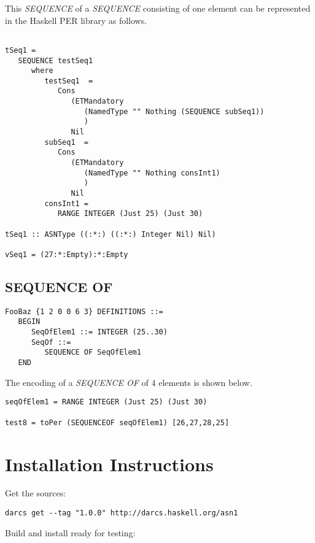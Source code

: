 \documentclass{article}
\begin{document}
This {\em SEQUENCE} of a {\em SEQUENCE} consisting of one element
can be represented in the Haskell PER library as follows.

\begin{lstlisting}[frame=single]

tSeq1 = 
   SEQUENCE testSeq1 
      where
         testSeq1  = 
            Cons 
               (ETMandatory 
                  (NamedType "" Nothing (SEQUENCE subSeq1))
                  )
               Nil
         subSeq1  = 
            Cons 
               (ETMandatory 
                  (NamedType "" Nothing consInt1)
                  ) 
               Nil
         consInt1 = 
            RANGE INTEGER (Just 25) (Just 30)

tSeq1 :: ASNType ((:*:) ((:*:) Integer Nil) Nil)

vSeq1 = (27:*:Empty):*:Empty

\end{lstlisting}

\subsection{SEQUENCE OF}

\begin{lstlisting}[frame=single]
FooBaz {1 2 0 0 6 3} DEFINITIONS ::=
   BEGIN
      SeqOfElem1 ::= INTEGER (25..30)
      SeqOf ::=
         SEQUENCE OF SeqOfElem1
   END
\end{lstlisting}

The encoding of a {\em SEQUENCE OF} of 4 elements is shown
below.

\begin{lstlisting}[frame=single]
seqOfElem1 = RANGE INTEGER (Just 25) (Just 30)

test8 = toPer (SEQUENCEOF seqOfElem1) [26,27,28,25]
\end{lstlisting}

\section{Installation Instructions}

Get the sources:

\lstset{language=shell,basicstyle=\ttfamily\small}
\begin{lstlisting}[frame=single]
darcs get --tag "1.0.0" http://darcs.haskell.org/asn1
\end{lstlisting}

Build and install ready for testing:
\end{document}
